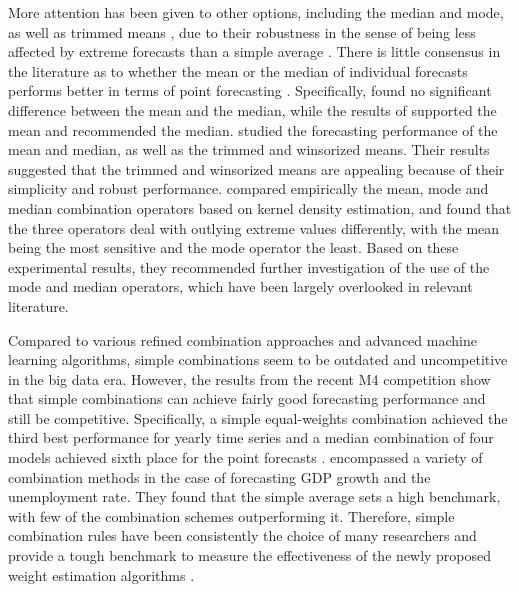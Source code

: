 \documentclass[11pt]{article}
\begin{document}
More attention has been given to other options, including the median and mode, as well as trimmed means \citep[e.g.,][]{Chan1999-io,Stock2004-rq,Genre2013-ut,Jose2014-uh,Grushka-Cockayne2017-dj}, due to their robustness in the sense of being less affected by extreme forecasts than a simple average \citep{Lichtendahl2020-ut}. There is little consensus in the literature as to whether the mean or the median of individual forecasts performs better in terms of point forecasting \citep{Kolassa2011-ai}. Specifically, \cite{McNees1992-qc} found no significant difference between the mean and the median, while the results of \cite{Stock2004-rq} supported the mean and \cite{Agnew1985-dj} recommended the median. \cite{Jose2008-vm} studied the forecasting performance of the mean and median, as well as the trimmed and winsorized means. Their results suggested that the trimmed and winsorized means are appealing because of their simplicity and robust performance. \cite{Kourentzes2014-hs} compared empirically the mean, mode and median combination operators based on kernel density estimation, and found that the three operators deal with outlying extreme values differently, with the mean being the most sensitive and the mode operator the least. Based on these experimental results, they recommended further investigation of the use of the mode and median operators, which have been largely overlooked in relevant literature.

Compared to various refined combination approaches and advanced machine learning algorithms, simple combinations seem to be outdated and uncompetitive in the big data era. However, the results from the recent M4 competition \citep{Makridakis2020-hu} show that simple combinations can achieve fairly good forecasting performance and still be competitive. Specifically, a simple equal-weights combination achieved the third best performance for yearly time series \citep{Shaub2019-on} and a median combination of four models achieved sixth place for the point forecasts \citep{Petropoulos2020-fp}. \cite{Genre2013-ut} encompassed a variety of combination methods in the case of forecasting GDP growth and the unemployment rate. They found that the simple average sets a high benchmark, with few of the combination schemes outperforming it. Therefore, simple combination rules have been consistently the choice of many researchers and provide a tough benchmark to measure the effectiveness of the newly proposed weight estimation algorithms \citep[e.g.,][]{Makridakis2000-he,Stock2004-rq,Makridakis2020-hu,Montero-Manso2020-tq,Kang2020-rl,Wang2021-un}.
\end{document}
